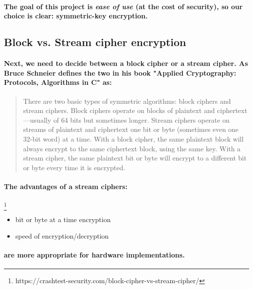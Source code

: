 \paragraph{The goal of this project is \emph{ease of use} (at the cost of security), so our choice is clear: symmetric-key encryption.}

\subsection{Block vs. Stream cipher encryption}
\paragraph{Next, we need to decide between a block cipher or a stream cipher. As Bruce Schneier defines the two in his book "Applied Cryptography: Protocols, Algorithms in C" as:}

\begin{quote}
There are two basic types of symmetric algorithms: block ciphers and stream ciphers. Block ciphers
operate on blocks of plaintext and ciphertext—usually of 64 bits but sometimes longer. Stream
ciphers operate on streams of plaintext and ciphertext one bit or byte (sometimes even one 32-bit
word) at a time. With a block cipher, the same plaintext block will always encrypt to the same
ciphertext block, using the same key. With a stream cipher, the same plaintext bit or byte will
encrypt to a different bit or byte every time it is encrypted.\cite[p. 12]{book2}
\end{quote}
\paragraph{The advantages of a stream ciphers:}\footnote{https://crashtest-security.com/block-cipher-vs-stream-cipher/}


\begin{itemize}
\item bit or byte at a time encryption
\item speed of encryption/decryption
\end{itemize}

\paragraph{are more appropriate for hardware implementations.}

